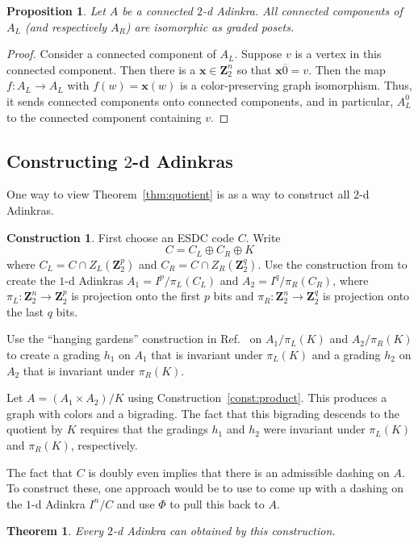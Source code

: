 \documentclass[12pt,twoside,singlespace]{article}
\numberwithin{equation}{section}
\newtheorem{thm}[equation]{Theorem}
\newtheorem{prop}[equation]{Proposition}
\theoremstyle{definition}
\newtheorem{construction}[equation]{Construction}
\newcommand{\ZZ}{\mathbf{Z}}
\renewcommand{\vec}[1]{\mathbf{#1}}
\begin{document}
\begin{prop}
\label{prop:componentsiso}
Let $A$ be a connected $2$-d Adinkra.  All connected components of $A_L$ (and respectively $A_R$) are isomorphic as graded posets.
\end{prop}
\begin{proof}
Consider a connected component of $A_L$.  Suppose $v$ is a vertex in this connected component.  Then there is a $\vec{x}\in\ZZ_2^n$ so that $\vec{x}\overline{0}=v$.  Then the map $f:A_L\to A_L$ with $f(w)=\vec{x}(w)$ is a color-preserving graph isomorphism.  Thus, it sends connected components onto connected components, and in particular, $A_L^0$ to the connected component containing $v$.
\end{proof}


\subsection{Constructing $2$-d Adinkras}
One way to view Theorem~\ref{thm:quotient} is as a way to construct all $2$-d Adinkras.

\begin{construction}
First choose an ESDC code $C$.  Write
\[C=C_L\oplus C_R\oplus K\]
where $C_L=C\cap Z_L(\ZZ_2^p)$ and $C_R=C\cap Z_R(\ZZ_2^q)$.  Use the construction from \cite{d2l:omni,d2l:topology} to create the $1$-d Adinkras $A_1=I^p/\pi_L(C_L)$ and $A_2=I^q/\pi_R(C_R)$, where $\pi_L:\ZZ_2^n\to\ZZ_2^p$ is projection onto the first $p$ bits and $\pi_R:\ZZ_2^n\to\ZZ_2^q$ is projection onto the last $q$ bits.

Use the ``hanging gardens'' construction in Ref.~\cite{d2l:graph-theoretic} on $A_1/\pi_L(K)$ and $A_2/\pi_R(K)$ to create a grading $h_1$ on $A_1$ that is invariant under $\pi_L(K)$ and a grading $h_2$ on $A_2$ that is invariant under $\pi_R(K)$.

Let $A=(A_1\times A_2)/K$ using Construction~\ref{const:product}.  This produces a graph with colors and a bigrading.  The fact that this bigrading descends to the quotient by $K$ requires that the gradings $h_1$ and $h_2$ were invariant under $\pi_L(K)$ and $\pi_R(K)$, respectively.

The fact that $C$ is doubly even implies that there is an admissible dashing on $A$.  To construct these, one approach would be to use \cite{d2l:topology} to come up with a dashing on the $1$-d Adinkra $I^n/C$ and use $\Phi$ to pull this back to $A$.
\end{construction}

\begin{thm}
Every $2$-d Adinkra can obtained by this construction.
\end{thm}
\end{document}
